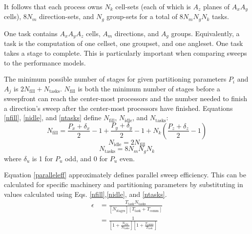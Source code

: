 \documentclass[11pt, letterpaper,titlepage,oneside]{article}
\begin{document}
It follows that each process owns $N_k$ cell-sets (each of which is $A_z$ planes of $A_x A_y$ cells), $8N_m$ direction-sets, and $N_g$ group-sets for a total of $8N_m N_g N_k$ tasks.

One task contains $A_x A_y A_z$ cells, $A_m$ directions, and $A_g$ groups. Equivalently, a task is the computation of one cellset, one groupset, and one angleset. One task takes a stage to complete.  This is particularly important when comparing sweeps to the performance models. 

The minimum possible number of stages for given partitioning parameters $P_i$ and $A_j$ is $2 N_{\text{fill}}+N_{\text{tasks}}$. $N_{\text{fill}}$ is both the minimum number of stages before a sweepfront can reach the center-most processors and the number needed to finish a direction's sweep after the center-most processors have finished. Equations \ref{nfill}, \ref{nidle}, and \ref{ntasks} define $N_{\text{fill}}$, $N_{\text{idle}}$, and $N_{\text{tasks}}$:
\begin{equation}
N_{\text{fill}} = \frac{P_x + \delta_x}{2} - 1 + \frac{P_y + \delta_y}{2} - 1 + N_k (\frac{P_z + \delta_z}{2} - 1)
\label{nfill}
\end{equation}
\begin{equation}
N_{\text{idle}} = 2 N_{\text{fill}}
\label{nidle}
\end{equation}
\begin{equation}
N_{\text{tasks}} = 8 N_m N_g N_k
\label{ntasks}
\end{equation}
where $\delta_u$ is 1 for $P_u$ odd, and 0 for $P_u$ even.

Equation \ref{paralleleff} approximately defines parallel sweep efficiency. This can be calculated for specific machinery and partitioning parameters by substituting in values calculated using Eqs. \ref{nfill},\ref{nidle}, and \ref{ntasks}.
\begin{equation}\label{paralleleff}
\begin{split}
\epsilon &= \frac{T_{\text{task}} N_{\text{tasks}}}{[N_{\text{stages}}] [T_{\text{task}} + T_{\text{comm}}]} \\
            &=\frac{1}{[1+\frac{N_{\text{idle}}}{N_{\text{tasks}}}][1 + \frac{T_{\text{comm}}}{T_{\text{task}}}]}
\end{split}
\end{equation}
\end{document}

